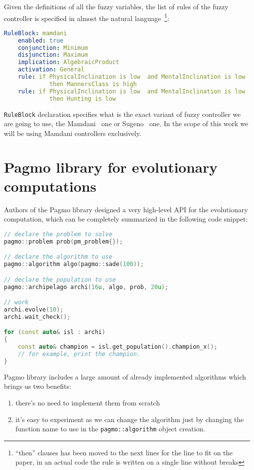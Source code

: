 \documentclass[12pt, a4paper]{report}
\begin{document}
  Given the definitions of all the fuzzy variables, the list of rules of the fuzzy controller is specified in almost the natural language~\footnote{``then'' clauses has been moved to the next lines for the line to fit on the paper, in an actual code the rule is written on a single line without breaks}:

  \begin{lstlisting}[language=yaml]
  RuleBlock: mamdani
    enabled: true
    conjunction: Minimum
    disjunction: Maximum
    implication: AlgebraicProduct
    activation: General
    rule: if PhysicalInclination is low  and MentalInclination is low
    	     then MannersClass is high
    rule: if PhysicalInclination is low  and MentalInclination is low 
    	     then Hunting is low
  \end{lstlisting}

	
  \texttt{RuleBlock} declaration specifies what is the exact variant of fuzzy controller we are going to use, the Mamdani~\cite{fuzzy::Mamdani} one or Sugeno~\cite{fuzzy::Sugeno} one.
  In the scope of this work we will be using Mamdani controllers exclusively.

	\section{Pagmo library for evolutionary computations}

	Authors of the Pagmo library designed a very high-level API for the evolutionary computation, which can be completely summarized in the following code snippet:
	
	\begin{lstlisting}[language=c++]
// declare the problem to solve
pagmo::problem prob(pm_problem{});

// declare the algorithm to use
pagmo::algorithm algo(pagmo::sade(100));

// declare the population to use
pagmo::archipelago archi(16u, algo, prob, 20u);

// work
archi.evolve(10);
archi.wait_check();

for (const auto& isl : archi)
{
	const auto& champion = isl.get_population().champion_x();
	// for example, print the champion.
}
	\end{lstlisting}

	Pagmo library includes a large amount of already implemented algorithms which brings us two benefits:
	
	\begin{enumerate}
		\item there's no need to implement them from scratch
		\item it's easy to experiment as we can change the algorithm just by changing the function name to use in the \texttt{pagmo::algorithm} object creation.
	\end{enumerate}
	
\end{document}
